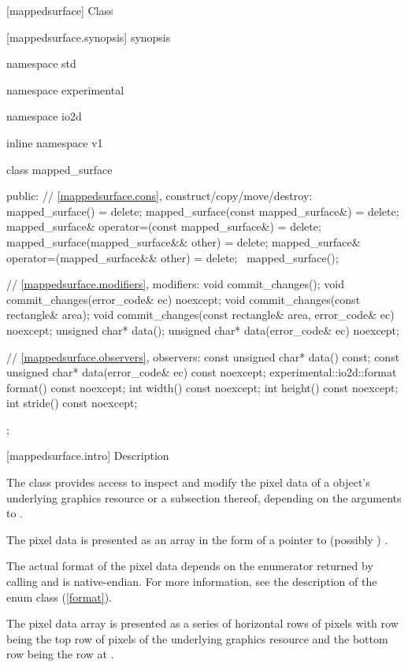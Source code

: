  [mappedsurface] {Class }

 [mappedsurface.synopsis] { synopsis}

\begin{codeblock}
namespace std { namespace experimental { namespace io2d { inline namespace v1 {
  class mapped_surface {
  public:
    // \ref{mappedsurface.cons}, construct/copy/move/destroy:
    mapped_surface() = delete;
    mapped_surface(const mapped_surface&) = delete;
    mapped_surface& operator=(const mapped_surface&) = delete;
    mapped_surface(mapped_surface&& other) = delete;
    mapped_surface& operator=(mapped_surface&& other) = delete;
    ~mapped_surface();
    
    // \ref{mappedsurface.modifiers}, modifiers:
    void commit_changes();
    void commit_changes(error_code& ec) noexcept;
    void commit_changes(const rectangle& area);
    void commit_changes(const rectangle& area, error_code& ec) noexcept;
    unsigned char* data();
    unsigned char* data(error_code& ec) noexcept;
    
    // \ref{mappedsurface.observers}, observers:
    const unsigned char* data() const;
    const unsigned char* data(error_code& ec) const noexcept;
    experimental::io2d::format format() const noexcept;
    int width() const noexcept;
    int height() const noexcept;
    int stride() const noexcept;
  };
} } } }
\end{codeblock}

 [mappedsurface.intro] { Description}

\pnum
{}
The  class provides access to inspect and modify the pixel data of a  object's underlying graphics resource or a subsection thereof, depending on the arguments to .

\pnum
The pixel data is presented as an array in the form of a pointer to (possibly ) .

\pnum
The actual format of the pixel data depends on the  enumerator returned by calling  and is native-endian. For more information, see the description of the  enum class (\ref{format}).

\pnum
The pixel data array is presented as a series of horizontal rows of pixels with row  being the top row of pixels of the underlying graphics resource and the bottom row being the row at .

